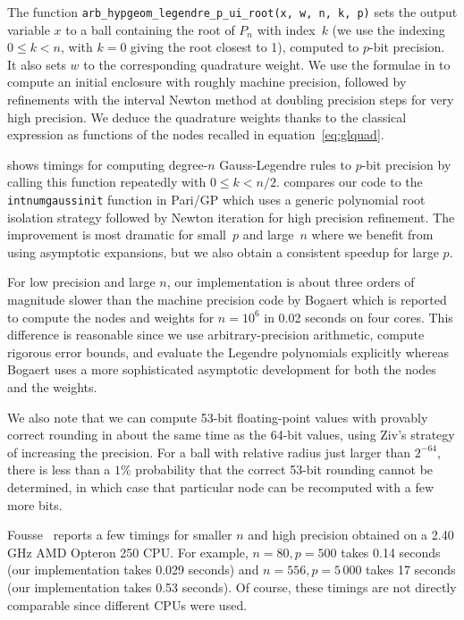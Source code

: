\documentclass[nohypdvips,review]{siamart0216}
\begin{document}
The function
\texttt{arb\_hypgeom\_legendre\_p\_ui\_root(x, w, n, k, p)}
sets the output variable
$x$ to a ball containing the root of $P_n$ with index~$k$ (we use the indexing
$0 \le k < n$, with $k = 0$ giving the root closest to 1),
computed to $p$-bit precision.
It also sets $w$ to the corresponding quadrature weight.
We use the formulae in \cite[Theorem~1(c)]{petras1999computation} to
compute an initial enclosure with roughly machine precision,
followed by refinements with the interval Newton method
at doubling precision steps for very high precision.
We deduce the quadrature weights thanks to the classical expression as
functions of the nodes recalled in equation~\cref{eq:glquad}.

 shows timings for computing
degree-$n$ Gauss-Legendre rules to $p$-bit precision
by calling this function repeatedly with $0 \le k < n / 2$.
 compares our code
to the \texttt{intnumgaussinit} function in Pari/GP
which uses a generic polynomial root isolation strategy
followed by Newton iteration for high precision refinement.
The improvement is most dramatic for small~$p$ and large~$n$ where
we benefit from using asymptotic expansions, but we also obtain a
consistent speedup for large $p$.

For low precision and large $n$, our implementation
is about three orders of magnitude slower than the machine precision
code by Bogaert \cite{bogaert2014iteration}
which is reported to compute the nodes and weights for $n = 10^6$
in 0.02 seconds on four cores.
This difference is reasonable since we use arbitrary-precision arithmetic,
compute rigorous error bounds, and evaluate the Legendre polynomials
explicitly whereas Bogaert uses a more sophisticated
asymptotic development for both the nodes and the weights.

We also note that we can compute 53-bit floating-point values
with provably correct rounding in about the same time as the 64-bit
values, using Ziv's strategy of increasing the precision.
For a ball with relative radius just larger than $2^{-64}$, there
is less than a $1\%$ probability that the correct 53-bit rounding
cannot be determined, in which case that particular node
can be recomputed with a few more bits.

Fousse~\cite{fousse2007accurate} reports a few timings for smaller $n$ and high precision
obtained on a 2.40 GHz AMD Opteron 250 CPU.
For example, $n = 80, p = 500$ takes 0.14 seconds (our implementation
takes 0.029 seconds) and $n = 556, p = 5\,000$ takes 17 seconds
(our implementation takes 0.53 seconds).
Of course, these timings are not directly comparable since different
CPUs were used.
\end{document}
